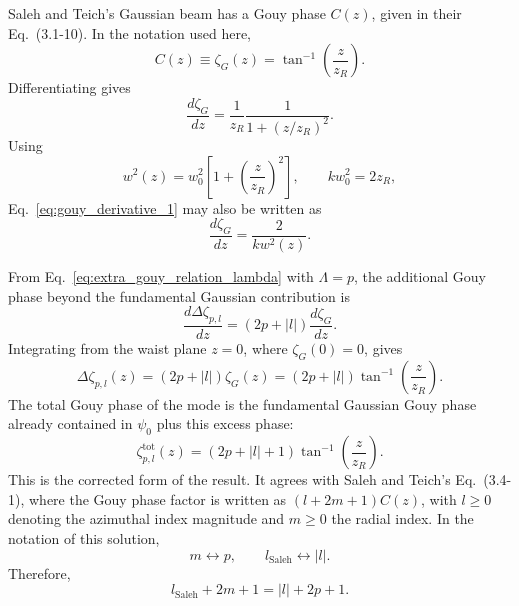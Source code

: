 \begin{resolucao}[Solution]
    Saleh and Teich's Gaussian beam has a Gouy phase $C(z)$, given in their Eq.~(3.1-10). In the notation used here,
    \[
        C(z)\equiv \zeta_G(z)
        =
        \tan^{-1}
        \left(
            \frac{z}{z_R}
        \right).
    \]
    Differentiating gives
    \begin{equation}
        \frac{d\zeta_G}{dz}
        =
        \frac{1}{z_R}
        \frac{1}{1+(z/z_R)^2}.
        \label{eq:gouy_derivative_1}
    \end{equation}
    Using
    \[
        w^2(z)
        =
        w_0^2
        \left[
            1+
            \left(
                \frac{z}{z_R}
            \right)^2
        \right],
        \qquad
        k w_0^2 = 2z_R,
    \]
    Eq.~\eqref{eq:gouy_derivative_1} may also be written as
    \begin{equation}
        \frac{d\zeta_G}{dz}
        =
        \frac{2}{k w^2(z)}.
        \label{eq:gouy_derivative_2}
    \end{equation}

    From Eq.~\eqref{eq:extra_gouy_relation_lambda} with $\Lambda=p$, the additional Gouy phase beyond the fundamental Gaussian contribution is
    \begin{equation}
        \frac{d\Delta\zeta_{p,l}}{dz}
        =
        (2p+|l|)
        \frac{d\zeta_G}{dz}.
        \label{eq:extra_gouy_differential}
    \end{equation}
    Integrating from the waist plane $z=0$, where $\zeta_G(0)=0$, gives
    \begin{equation}
        \Delta\zeta_{p,l}(z)
        =
        (2p+|l|)
        \zeta_G(z)
        =
        (2p+|l|)
        \tan^{-1}
        \left(
            \frac{z}{z_R}
        \right).
        \label{eq:extra_gouy_integrated}
    \end{equation}
    The total Gouy phase of the mode is the fundamental Gaussian Gouy phase already contained in $\psi_0$ plus this excess phase:
    \begin{equation}
        \boxed{
        \zeta_{p,l}^{\mathrm{tot}}(z)
        =
        (2p+|l|+1)
        \tan^{-1}
        \left(
            \frac{z}{z_R}
        \right)
        }.
        \label{eq:total_gouy_lg}
    \end{equation}
    This is the corrected form of the result. It agrees with Saleh and Teich's Eq.~(3.4-1), where the Gouy phase factor is written as $(l+2m+1)C(z)$, with $l\geq0$ denoting the azimuthal index magnitude and $m\geq0$ the radial index. In the notation of this solution,
    \[
        m \leftrightarrow p,
        \qquad
        l_{\mathrm{Saleh}}\leftrightarrow |l|.
    \]
    Therefore,
    \[
        l_{\mathrm{Saleh}}+2m+1
        =
        |l|+2p+1.
    \]


\end{resolucao}
